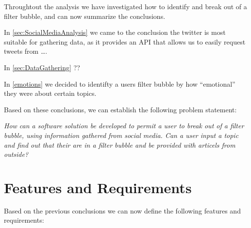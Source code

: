 
Throughtout the analysis we have investigated how to identify and break out of a
filter bubble, and can now summarize the conclusions.\nl

In \autoref{sec:SocialMediaAnalysis} we came to the conclusion the twitter is
most suitable for gathering data, as it provides an API that allows us to easily
request tweets from \ldots {}.\nl

In \autoref{sec:DataGathering} ??\nl

In \autoref{emotions} we decided to identifty a users filter bubble by how
``emotional'' they were about certain topics.\nl

Based on these conclusions, we can establish the following problem statement:

\begin{center}
\begin{minipage}{0.8\linewidth}

\textit{How can a software solution be developed to permit a user to break out of
a filter bubble, using information gathered from social media.
Can a user input a topic and find out that their are in a filter bubble and be
provided with articels from outside?}

\end{minipage}
\end{center}

\section{Features and Requirements}
Based on the previous conclusions we can now define the following features and
requirements:




